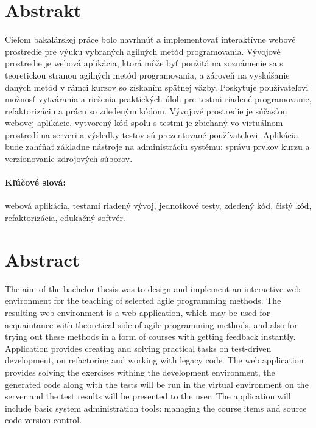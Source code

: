 \documentclass[12pt, oneside]{book}  %
\begin{document}
\newpage 
\section*{Abstrakt}


Cieľom bakalárskej práce bolo navrhnúť a implementovať interaktívne webové prostredie pre výuku vybraných agilných metód programovania. Vývojové prostredie je webová aplikácia, ktorá môže byť použitá na zoznámenie sa s teoretickou stranou agilných metód programovania, a zároveň na vyskúšanie daných metód v rámci kurzov so získaním spätnej väzby. Poskytuje používateľovi možnosť vytvárania a riešenia praktických úloh pre testmi riadené programovanie, refaktorizáciu a prácu so zdedeným kódom. Vývojové prostredie je súčasťou webovej aplikácie, vytvorený kód spolu s testmi je zbiehaný vo virtuálnom prostredí na serveri a výsledky testov sú prezentované používateľovi. Aplikácia bude zahŕňať základne nástroje na administráciu systému: správu prvkov kurzu a verzionovanie zdrojových súborov.

\paragraph*{Kľúčové slová:} webová aplikácia, testami riadený vývoj, jednotkové testy, zdedený kód, čistý kód, refaktorizácia, edukačný softvér.


\newpage 
\section*{Abstract}

The aim of the bachelor thesis was to design and implement an interactive web environment for the teaching of selected agile programming methods. The resulting web environment is a web application, which may be used for acquaintance with theoretical side of agile programming methods, and also for trying out these methods in a form of courses with getting feedback instantly. Application provides creating and solving practical tasks on test-driven development, on refactoring and working with legacy code. The web application provides solving the exercises withing the development environment, the generated code along with the tests will be run in the virtual environment on the server and the test results will be presented to the user. The application will include basic system administration tools: managing the course items and source code version control.
\end{document}
